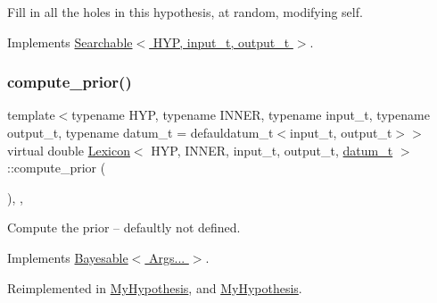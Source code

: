 Fill in all the holes in this hypothesis, at random, modifying self. 



Implements \hyperlink{class_searchable_a3ae6263b49a0f9da94f5dcc23af6618e}{Searchable$<$ H\+Y\+P, input\+\_\+t, output\+\_\+t $>$}.

\mbox{\label{class_lexicon_a2e099a68dd08d62897b40647f92eba1c}} 
\subsubsection{\texorpdfstring{compute\+\_\+prior()}{compute\_prior()}}
{\footnotesize\ttfamily template$<$typename H\+YP, typename I\+N\+N\+ER, typename input\+\_\+t, typename output\+\_\+t, typename datum\+\_\+t = defauldatum\+\_\+t$<$input\+\_\+t, output\+\_\+t$>$$>$ \\
virtual double \hyperlink{class_lexicon}{Lexicon}$<$ H\+YP, I\+N\+N\+ER, input\+\_\+t, output\+\_\+t, \hyperlink{class_bayesable_a9f1a6c0cd7855550fa10b1a8f13a5867}{datum\+\_\+t} $>$\+::compute\+\_\+prior (\begin{DoxyParamCaption}{ }\end{DoxyParamCaption})\hspace{0.3cm}{\ttfamily [inline]}, {\ttfamily [override]}, {\ttfamily [virtual]}}



Compute the prior -- defaultly not defined. 



Implements \hyperlink{class_bayesable_a1b057a17212ced123545133e2297c01b}{Bayesable$<$ Args... $>$}.



Reimplemented in \hyperlink{class_my_hypothesis_ab092094c5fc31730de4f40609220bb18}{My\+Hypothesis}, and \hyperlink{class_my_hypothesis_a67477313b60b21158bbfaad35dc5d275}{My\+Hypothesis}.

\mbox{\label{class_lexicon_a2b17608f66415c6a7d55b6a8f344db21}} 
